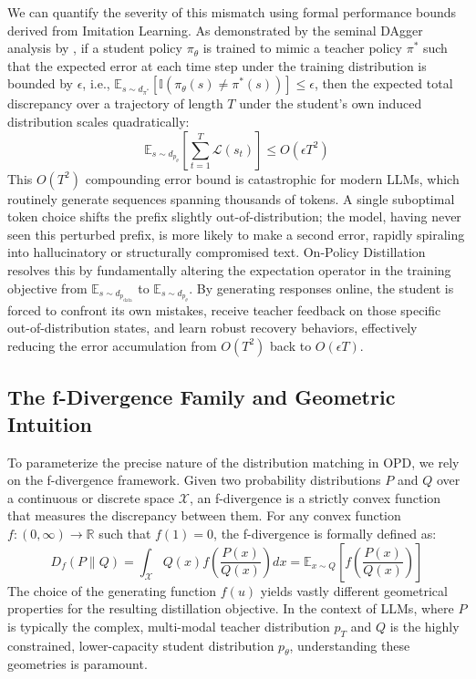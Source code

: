 \documentclass{article} %
\newcommand{\ptheta}{p_\theta}
\newcommand{\pteacher}{p_T}
\newcommand{\pdata}{p_{\mathrm{data}}}
\newcommand{\loss}{\mathcal{L}}
\begin{document}
We can quantify the severity of this mismatch using formal performance bounds derived from Imitation Learning. As demonstrated by the seminal DAgger analysis by \citet{ross2011reduction}, if a student policy $\pi_\theta$ is trained to mimic a teacher policy $\pi^*$ such that the expected error at each time step under the training distribution is bounded by $\epsilon$, i.e., $\mathbb{E}_{s \sim d_{\pi^*}}[\mathbb{I}(\pi_\theta(s) \neq \pi^*(s))] \le \epsilon$, then the expected total discrepancy over a trajectory of length $T$ under the student's own induced distribution scales quadratically:
\begin{equation}
    \mathbb{E}_{s \sim d_{\ptheta}} \left[ \sum_{t=1}^T \loss(s_t) \right] \le O(\epsilon T^2)
\end{equation}
This $O(T^2)$ compounding error bound is catastrophic for modern LLMs, which routinely generate sequences spanning thousands of tokens. A single suboptimal token choice shifts the prefix slightly out-of-distribution; the model, having never seen this perturbed prefix, is more likely to make a second error, rapidly spiraling into hallucinatory or structurally compromised text. On-Policy Distillation resolves this by fundamentally altering the expectation operator in the training objective from $\mathbb{E}_{s \sim d_{\pdata}}$ to $\mathbb{E}_{s \sim d_{\ptheta}}$. By generating responses online, the student is forced to confront its own mistakes, receive teacher feedback on those specific out-of-distribution states, and learn robust recovery behaviors, effectively reducing the error accumulation from $O(T^2)$ back to $O(\epsilon T)$.

\subsection{The f-Divergence Family and Geometric Intuition}
\label{subsec:f_divergence}

To parameterize the precise nature of the distribution matching in OPD, we rely on the f-divergence framework. Given two probability distributions $P$ and $Q$ over a continuous or discrete space $\mathcal{X}$, an f-divergence is a strictly convex function that measures the discrepancy between them. For any convex function $f: (0, \infty) \to \mathbb{R}$ such that $f(1) = 0$, the f-divergence is formally defined as:
\begin{equation}
    D_f(P \parallel Q) = \int_{\mathcal{X}} Q(x) f\left(\frac{P(x)}{Q(x)}\right) dx = \mathbb{E}_{x \sim Q} \left[ f\left(\frac{P(x)}{Q(x)}\right) \right]
\end{equation}
The choice of the generating function $f(u)$ yields vastly different geometrical properties for the resulting distillation objective. In the context of LLMs, where $P$ is typically the complex, multi-modal teacher distribution $\pteacher$ and $Q$ is the highly constrained, lower-capacity student distribution $\ptheta$, understanding these geometries is paramount.
\end{document}
